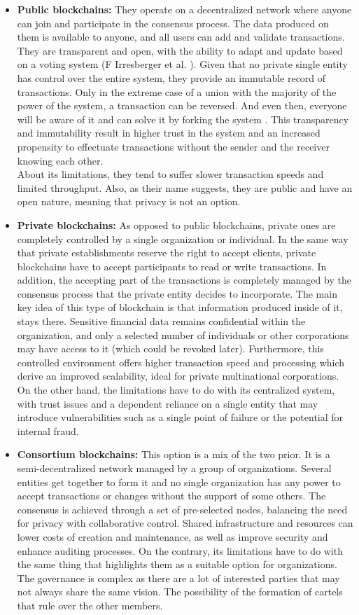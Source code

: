 \begin{itemize}
    \item \textbf{Public blockchains:} They operate on a decentralized network where anyone can join and participate in the consensus process. The data produced on them is available to anyone, and all users can add and validate transactions. They are transparent and open, with the ability to adapt and update based on a voting system (F Irresberger et al. \cite{publicBlockchains}). Given that no private single entity has control over the entire system, they provide an immutable record of transactions. Only in the extreme case of a union with the majority of the power of the system, a transaction can be reversed. And even then, everyone will be aware of it and can solve it by forking the system \cite{forks}. This transparency and immutability result in higher trust in the system and an increased propensity to effectuate transactions without the sender and the receiver knowing each other. \\
    About its limitations, they tend to suffer slower transaction speeds and limited throughput. Also, as their name suggests, they are public and have an open nature, meaning that privacy is not an option.
    \item \textbf{Private blockchains:} As opposed to public blockchains, private ones are completely controlled by a single organization or individual. In the same way that private establishments reserve the right to accept clients, private blockchains have to accept participants to read or write transactions. In addition, the accepting part of the transactions is completely managed by the consensus process that the private entity decides to incorporate. The main key idea of this type of blockchain is that information produced inside of it, stays there. Sensitive financial data remains confidential within the organization, and only a selected number of individuals or other corporations may have access to it (which could be revoked later). Furthermore, this controlled environment offers higher transaction speed and processing which derive an improved scalability, ideal for private multinational corporations. On the other hand, the limitations have to do with its centralized system, with trust issues and a dependent reliance on a single entity that may introduce vulnerabilities such as a single point of failure or the potential for internal fraud.
    \item \textbf{Consortium blockchains:} This option is a mix of the two prior. It is a semi-decentralized network managed by a group of organizations. Several entities get together to form it and no single organization has any power to accept transactions or changes without the support of some others. The consensus is achieved through a set of pre-selected nodes, balancing the need for privacy with collaborative control. Shared infrastructure and resources can lower costs of creation and maintenance, as well as improve security and enhance auditing processes. On the contrary, its limitations have to do with the same thing that highlights them as a suitable option for organizations. The governance is complex as there are a lot of interested parties that may not always share the same vision. The possibility of the formation of cartels that rule over the other members. 

\end{itemize}
